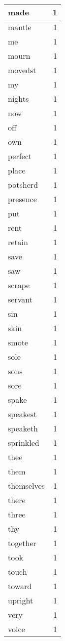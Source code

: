 \begin{center}
\begin{longtable}{l|r}
made & 1 \\ \hline
mantle & 1 \\ \hline
me & 1 \\ \hline
mourn & 1 \\ \hline
movedst & 1 \\ \hline
my & 1 \\ \hline
nights & 1 \\ \hline
now & 1 \\ \hline
off & 1 \\ \hline
own & 1 \\ \hline
perfect & 1 \\ \hline
place & 1 \\ \hline
potsherd & 1 \\ \hline
presence & 1 \\ \hline
put & 1 \\ \hline
rent & 1 \\ \hline
retain & 1 \\ \hline
save & 1 \\ \hline
saw & 1 \\ \hline
scrape & 1 \\ \hline
servant & 1 \\ \hline
sin & 1 \\ \hline
skin & 1 \\ \hline
smote & 1 \\ \hline
sole & 1 \\ \hline
sons & 1 \\ \hline
sore & 1 \\ \hline
spake & 1 \\ \hline
speakest & 1 \\ \hline
speaketh & 1 \\ \hline
sprinkled & 1 \\ \hline
thee & 1 \\ \hline
them & 1 \\ \hline
themselves & 1 \\ \hline
there & 1 \\ \hline
three & 1 \\ \hline
thy & 1 \\ \hline
together & 1 \\ \hline
took & 1 \\ \hline
touch & 1 \\ \hline
toward & 1 \\ \hline
upright & 1 \\ \hline
very & 1 \\ \hline
voice & 1 \\ \hline

\end{longtable}
\end{center}
